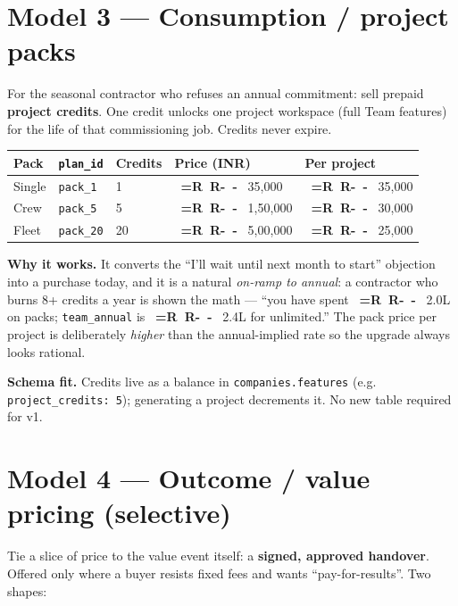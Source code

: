 \documentclass[11pt,a4paper]{article}
\newcommand{\Rs}{%
  \mbox{%
    \sffamily\bfseries
    \setbox0=\hbox{R}%
    R\kern-\wd0
    \raisebox{0.42em}{\rule{0.55em}{0.07em}}%
    \kern-\wd0
    \raisebox{0.25em}{\rule{0.55em}{0.07em}}%
    \kern\wd0
  }%
}
\newcommand{\plan}[1]{\texttt{\textcolor{accent}{#1}}}
\newcommand{\flag}[1]{\texttt{#1}}
\begin{document}
\section{Model 3 --- Consumption / project packs}

For the seasonal contractor who refuses an annual commitment: sell prepaid
\textbf{project credits}. One credit unlocks one project workspace (full Team
features) for the life of that commissioning job. Credits never expire.

\begin{center}
\begin{tabular}{@{}L{2.6cm} L{2.8cm} R{1.8cm} R{2.6cm} L{2.6cm}@{}}
  \toprule
  \textbf{Pack} & \textbf{\texttt{plan\_id}} & \textbf{Credits} & \textbf{Price (INR)} & \textbf{Per project} \\
  \midrule
  Single  & \plan{pack\_1}  & 1  & \Rs 35{,}000   & \Rs 35{,}000 \\
  Crew    & \plan{pack\_5}  & 5  & \Rs 1{,}50{,}000 & \Rs 30{,}000 \\
  Fleet   & \plan{pack\_20} & 20 & \Rs 5{,}00{,}000 & \Rs 25{,}000 \\
  \bottomrule
\end{tabular}
\end{center}

\noindent\textbf{Why it works.} It converts the ``I'll wait until next month to
start'' objection into a purchase today, and it is a natural \emph{on-ramp to
annual}: a contractor who burns 8+ credits a year is shown the math --- ``you have
spent \Rs 2.0L on packs; \plan{team\_annual} is \Rs 2.4L for unlimited.'' The pack
price per project is deliberately \emph{higher} than the annual-implied rate so
the upgrade always looks rational.

\textbf{Schema fit.} Credits live as a balance in \texttt{companies.features}
(e.g. \flag{project\_credits: 5}); generating a project decrements it. No new
table required for v1.

\section{Model 4 --- Outcome / value pricing (selective)}

Tie a slice of price to the value event itself: a \textbf{signed, approved
handover}. Offered only where a buyer resists fixed fees and wants
``pay-for-results''. Two shapes:
\end{document}
